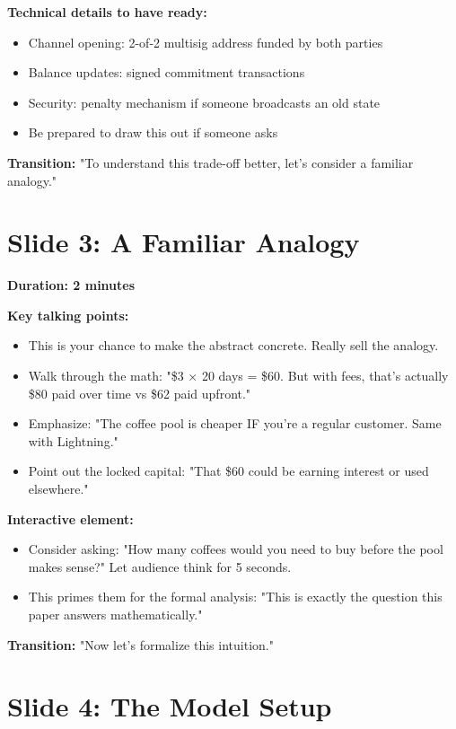\documentclass[11pt]{article}
\begin{document}
\textbf{Technical details to have ready:}
\begin{itemize}
    \item Channel opening: 2-of-2 multisig address funded by both parties
    \item Balance updates: signed commitment transactions
    \item Security: penalty mechanism if someone broadcasts an old state
    \item Be prepared to draw this out if someone asks
\end{itemize}

\textbf{Transition:} "To understand this trade-off better, let's consider a familiar analogy."

\section*{Slide 3: A Familiar Analogy}

\textbf{Duration: 2 minutes}

\textbf{Key talking points:}
\begin{itemize}
    \item This is your chance to make the abstract concrete. Really sell the analogy.
    \item Walk through the math: "\$3 × 20 days = \$60. But with fees, that's actually \$80 paid over time vs \$62 paid upfront."
    \item Emphasize: "The coffee pool is cheaper IF you're a regular customer. Same with Lightning."
    \item Point out the locked capital: "That \$60 could be earning interest or used elsewhere."
\end{itemize}

\textbf{Interactive element:}
\begin{itemize}
    \item Consider asking: "How many coffees would you need to buy before the pool makes sense?" Let audience think for 5 seconds.
    \item This primes them for the formal analysis: "This is exactly the question this paper answers mathematically."
\end{itemize}

\textbf{Transition:} "Now let's formalize this intuition."

\section*{Slide 4: The Model Setup}
\end{document}
